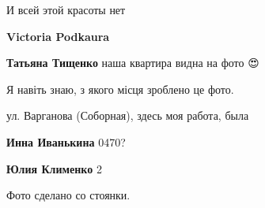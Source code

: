  
 
 
 
 

\qqSecCmt


И всей этой красоты нет

\textbf{Victoria Podkaura}

\textbf{Татьяна Тищенко} наша квартира видна на фото 😍

Я навіть знаю, з якого місця зроблено це фото.


ул. Варганова (Соборная), здесь моя работа, была

\textbf{Инна Иванькина} 0470?

\textbf{Юлия Клименко} 2

Фото сделано со стоянки.
